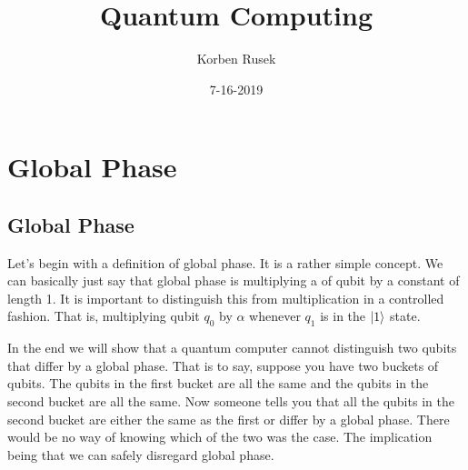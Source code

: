 \documentclass{article}
\author{Korben Rusek}
\title{Quantum Computing}
\date{7-16-2019}
\begin{document}
\maketitle
\newcommand{\gindex}[2]{|#1\!:\!#2|}
\newcommand{\lcm}{\textrm{lcm}}
\newcommand{\irr}{\textrm{irr}}
\newcommand{\sylp}{$Syl_{p}$}
\newcommand{\phnt}[1]{$\phantom{1}^{#1}$}
\newcommand{\gen}[1]{\langle#1\rangle}
\newcommand{\BN}{\mathbb{N}}
\newcommand{\BZ}{\mathbb{Z}}
\newcommand{\BQ}{\mathbb{Q}}
\newcommand{\BR}{\mathbb{R}}
\newcommand{\BC}{\mathbb{C}}
\newcommand{\BF}{\mathbb{F}}
\newcommand{\CF}{\mathcal{F}}
\newcommand{\CQ}{\mathcal{Q}}
\newcommand{\fa}{\mathfrak{a}}
\newcommand{\fb}{\mathfrak{b}}
\newcommand{\fp}{\mathfrak{p}}
\newcommand{\fq}{\mathfrak{q}}
\newcommand{\fm}{\mathfrak{m}}
\newcommand{\FN}{\mathfrak{N}}
\newcommand{\FR}{\mathfrak{R}}
\newcommand{\set}[1]{\{#1\}}
\newcommand{\trv}{\set{1}}
\newcommand{\Aut}{\mathrm{Aut}}
\newcommand{\End}{\mathrm{End}}
\newcommand{\Ker}{\mathrm{Ker}}
\newcommand{\chr}{\mathrm{char}}
\theoremstyle{definition}
\newtheorem{theorem}{Theorem}[section]
\newtheorem{lemma}[theorem]{Lemma}
\newtheorem{corollary}[theorem]{Corollary}
\newtheorem{definition}[theorem]{Definition}
\newtheorem{postulate}{Postulate}[section]

\section{Global Phase}

\setcounter{subsection}{0}
\subsection{Global Phase}

Let's begin with a definition of global phase. It is a rather simple
concept. We can basically just say that global phase is multiplying 
a of qubit by a constant of length 1. It is important to distinguish 
this from multiplication in a controlled fashion. That is, multiplying 
qubit $q_0$ by $\alpha$ whenever $q_1$ is in the $\ket1$ state.

In the end we will show that a quantum computer cannot distinguish 
two qubits that differ by a global phase. That is to say, suppose you 
have two buckets of qubits. The qubits in the first bucket are all
the same and the qubits in the second bucket are all the same. Now 
someone tells you that all the qubits in the second bucket are either
the same as the first or differ by a global phase. There would be 
no way of knowing which of the two was the case.
The implication being that we can safely disregard global phase.
\end{document}
